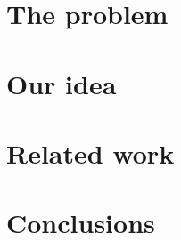 \section{The problem}  %
  
\section{Our idea}     %
  
  
\section{Related work} %
  
\section{Conclusions}
  
